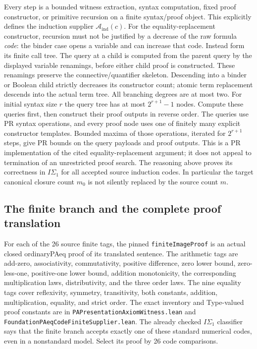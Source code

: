 Every step is a bounded witness extraction, syntax computation, fixed
proof constructor, or primitive recursion on a finite syntax/proof object.
This explicitly defines the induction supplier $\mathcal A_{\mathrm{ind}}(c)$.
For the equality-replacement constructor, recursion must not be justified
by a decrease of the raw formula \emph{code}: the binder case opens a
variable and can increase that code.  Instead form its finite call tree.
The query at a child is computed from the parent query by the displayed
variable renamings, before either child proof is constructed.  These
renamings preserve the connective/quantifier skeleton.  Descending into
a binder or Boolean child strictly decreases its constructor count;
atomic term replacement descends into the actual term tree.  All branching
degrees are at most two.  For initial syntax size $r$ the query tree has
at most $2^{r+1}-1$ nodes.  Compute these queries first, then construct
their proof outputs in reverse order.  The queries use PR syntax
operations, and every proof node uses one of finitely many explicit
constructor templates.  Bounded maxima of those operations, iterated for
$2^{r+1}$ steps, give PR bounds on the query payloads and proof outputs.
This is a PR implementation of the cited equality-replacement argument;
it does not appeal to termination of an unrestricted proof search.
The reasoning above proves its correctness in $I\Sigma_1$ for all accepted
source induction codes.  In particular the target canonical closure count
$m_0$ is not silently replaced by the source count $m$.

\subsection{The finite branch and the complete proof translation}

For each of the 26 source finite tags, the pinned
\texttt{finiteImageProof} is an actual closed ordinaryPAeq proof of its
translated sentence.  The arithmetic tags are add-zero, associativity,
commutativity, positive difference, zero lower bound, zero-less-one,
positive-one lower bound, addition monotonicity, the corresponding
multiplication laws, distributivity, and the three order laws.  The nine
equality tags cover reflexivity, symmetry, transitivity, both constants,
addition, multiplication, equality, and strict order.  The exact inventory
and Type-valued proof constants are in
\texttt{PAPresentationAxiomWitness.lean} and
\texttt{FoundationPAeqCodeFiniteSupplier.lean}.
The already checked $I\Sigma_1$ classifier says that the finite branch
accepts exactly one of these standard numerical codes, even in a
nonstandard model.  Select its proof by 26 code comparisons.


